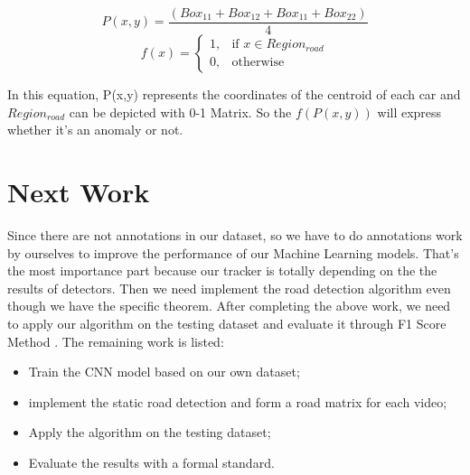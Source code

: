 \documentclass[10pt,twocolumn,letterpaper]{article}
\begin{document}
$$P(x, y) = \frac{(Box_{11} +  Box_{12} + Box_{11} +  Box_{22})}{4}$$
\[
    f(x)= 
\begin{cases}
    1,& \text{if } x\in Region_{road}\\
    0,              & \text{otherwise}
\end{cases}
\]

In this equation, P(x,y) represents the coordinates of the centroid of each car and $Region_{road}$ can be depicted with 0-1 Matrix. So the $f(P(x, y))$ will express whether it's an anomaly or not.

\section{Next Work}

Since there are not annotations in our dataset, so we have to do annotations work by ourselves to improve the performance of our Machine Learning models. That's the most importance part because our tracker is totally depending on the the results of detectors. Then we need implement the road detection algorithm even though we have the specific theorem. After completing the above work, we need to apply our algorithm on the testing dataset and evaluate it through F1 Score Method \cite{aicitychallenge}. The remaining work is listed:

\begin{itemize}[topsep=0pt, itemsep=-5pt]
   \item Train the CNN model based on our own dataset;
   \item implement the static road detection and form a road matrix for each video;
   \item Apply the algorithm on the testing dataset;
   \item Evaluate the results with a formal standard.
\end{itemize}



{\small


}
\end{document}
